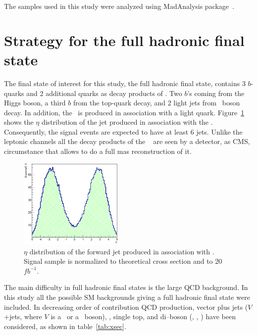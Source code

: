 The samples used in this study were analyzed using MadAnalysis package~\cite{Conte:2012fm, Conte:2014zja}.

\section{Strategy for the full hadronic final state}
\label{sec:Pstra}

The final state of interest for this study, the full hadronic final state, contains 3 $b$-quarks and 2 additional quarks as decay products of \Tp. Two $b$'s coming from the Higgs boson, a third $b$ from the top-quark decay, and 2 light jets from \W~boson decay. In addition, the \Tp~is produced in association with a light quark. Figure~\ref{fig:ForwJ} shows the $\eta$ distribution of the jet produced in association with the \Tp. Consequently, the signal events are expected to have at least 6 jets. Unlike the leptonic channels all the decay products of the \Tp~ are seen by a detector, as CMS, circumstance that allows to do a full mas reconstruction of it.

\begin{figure}[!Hhtbp]
  \begin{center}
    \includegraphics[width=0.45\textwidth]{figs/Pheno/SixthJet.png}
    \caption{$\eta$ distribution of the forward jet produced in association with \Tp. Signal sample is normalized to theoretical cross section and to 20~$fb^{-1}$.}
    \label{fig:ForwJ}
  \end{center}
\end{figure}

The main difficulty in full hadronic final states is the large QCD background. In this study all the possible SM backgrounds giving a full hadronic final state were included. In decreasing order of contribution QCD production, vector plus jets ($V$+jets, where $V$ is a \W~or a \Z~boson), \ttbar, single top, and di--boson (\W\W, \W\Z, \Z\Z) have been considered, as shown in table~\ref{tab:xsec}. 

